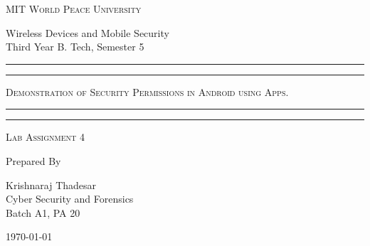\documentclass[11pt]{article}
\begin{document}
\begin{titlepage}
    \centering


    \huge\textsc{
        MIT World Peace University
    }\\

    \vspace{0.75\baselineskip} %

    \LARGE{
        Wireless Devices and Mobile Security\\
        Third Year B. Tech, Semester 5
    }

    \vfill %


    \rule{\textwidth}{1.6pt}\vspace*{-\baselineskip}\vspace*{2pt}
    \rule{\textwidth}{0.6pt}
    \vspace{0.75\baselineskip} %



    \huge{\textsc{
            Demonstration of Security Permissions in Android using Apps.
        }} \\



    \vspace{0.5\baselineskip} %
    \rule{\textwidth}{0.6pt}\vspace*{-\baselineskip}\vspace*{2.8pt}
    \rule{\textwidth}{1.6pt}

    \vspace{1\baselineskip} %


    \LARGE\textsc{
        Lab Assignment 4
    } %
    \vfill


    Prepared By
    \vspace{0.5\baselineskip} %

    \Large{
        Krishnaraj Thadesar \\
        Cyber Security and Forensics\\
        Batch A1, PA 20
    }


    \vspace{0.5\baselineskip} %
    \today

\end{titlepage}
\end{document}
